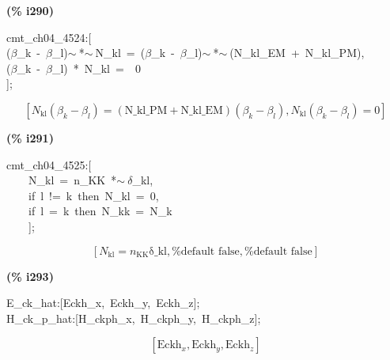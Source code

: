 \documentclass[fleqn]{article}
\begin{document}
\noindent
\begin{minipage}[t]{4.000000em}\color{red}\bfseries
(\% i290)	
\end{minipage}
\begin{minipage}[t]{\textwidth}\color{blue}
cmt\_ch04\_4524:[\\
(\ensuremath{\beta}\_k\ -\ \ensuremath{\beta}\_l)\ensuremath{\sim\ }*\ensuremath{\sim\ }N\_kl\ =\ (\ensuremath{\beta}\_k\ -\ \ensuremath{\beta}\_l)\ensuremath{\sim\ }*\ensuremath{\sim\ }(N\_kl\_EM\ +\ N\_kl\_PM),\ \\
(\ensuremath{\beta}\_k\ -\ \ensuremath{\beta}\_l)\ *\ N\_kl\ =\ \ 0\ \ \ \ \\
];
\end{minipage}
\[\displaystyle \tag{\% o290} 
\left[ {N_{\ensuremath{\mathrm{kl}}}} \left( {{\beta }_k}-{{\beta }_l}\right) =\left( \ensuremath{\mathrm{N\_ kl\_ PM}}+\ensuremath{\mathrm{N\_ kl\_ EM}}\right)  \left( {{\beta }_k}-{{\beta }_l}\right) \operatorname{,}{N_{\ensuremath{\mathrm{kl}}}} \left( {{\beta }_k}-{{\beta }_l}\right) =0\right] \mbox{}
\]


\noindent
\begin{minipage}[t]{4.000000em}\color{red}\bfseries
(\% i291)	
\end{minipage}
\begin{minipage}[t]{\textwidth}\color{blue}
cmt\_ch04\_4525:[\\
\ \ \ \ N\_kl\ =\ n\_KK\ *\ensuremath{\sim\ }\ensuremath{\delta}\_kl,\\
\ \ \ \ if\ l\ !=\ k\ then\ N\_kl\ =\ 0,\\
\ \ \ \ if\ l\ =\ k\ then\ N\_kk\ =\ N\_k\\
\ \ \ \ ];
\end{minipage}
\[\displaystyle \tag{\% o291} 
\left[ {N_{\ensuremath{\mathrm{kl}}}}={n_{\ensuremath{\mathrm{KK}}}} \ensuremath{\mathrm{\delta \_ kl}}\operatorname{,}\mbox{%
false}\operatorname{,}\mbox{%
false}\right] \mbox{}
\]


\noindent
\begin{minipage}[t]{4.000000em}\color{red}\bfseries
(\% i293)	
\end{minipage}
\begin{minipage}[t]{\textwidth}\color{blue}
E\_ck\_hat:[Eckh\_x,\ Eckh\_y,\ Eckh\_z];\\
H\_ck\_p\_hat:[H\_ckph\_x,\ H\_ckph\_y,\ H\_ckph\_z];
\end{minipage}
\[\displaystyle \tag{\% o292} 
\left[ {{\ensuremath{\mathrm{Eckh}}}_x}\operatorname{,}{{\ensuremath{\mathrm{Eckh}}}_y}\operatorname{,}{{\ensuremath{\mathrm{Eckh}}}_z}\right] \mbox{}\]
\end{document}

